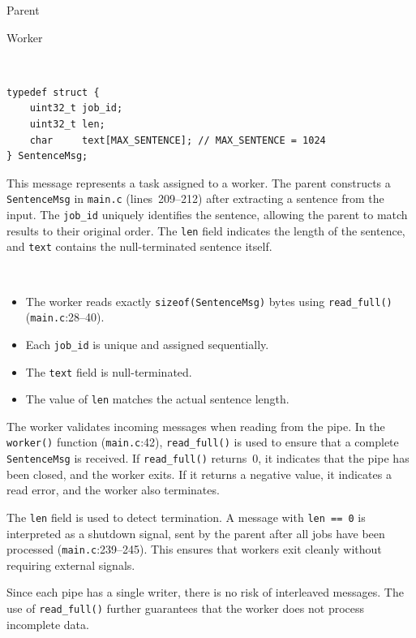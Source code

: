 \documentclass[12pt]{article}
\begin{document}
\begin{description}[style=nextline]
  \item[Sender] Parent
  \item[Receiver] Worker
  \item[Encoding]~

\begin{lstlisting}
typedef struct {
    uint32_t job_id;
    uint32_t len;
    char     text[MAX_SENTENCE]; // MAX_SENTENCE = 1024
} SentenceMsg;
\end{lstlisting}

  \item[Semantics]
    This message represents a task assigned to a worker. The parent
    constructs a \texttt{SentenceMsg} in \texttt{main.c} (lines~209--212)
    after extracting a sentence from the input. The \texttt{job\_id}
    uniquely identifies the sentence, allowing the parent to match results
    to their original order. The \texttt{len} field indicates the length of
    the sentence, and \texttt{text} contains the null-terminated sentence
    itself.

  \item[Invariants]~
    \begin{itemize}
      \item The worker reads exactly \texttt{sizeof(SentenceMsg)} bytes
            using \texttt{read\_full()} (\texttt{main.c}:28--40).
      \item Each \texttt{job\_id} is unique and assigned sequentially.
      \item The \texttt{text} field is null-terminated.
      \item The value of \texttt{len} matches the actual sentence length.
    \end{itemize}

  \item[Error handling]
    The worker validates incoming messages when reading from the pipe. In
    the \texttt{worker()} function (\texttt{main.c}:42), \texttt{read\_full()}
    is used to ensure that a complete \texttt{SentenceMsg} is received. If
    \texttt{read\_full()} returns~0, it indicates that the pipe has been
    closed, and the worker exits. If it returns a negative value, it
    indicates a read error, and the worker also terminates.

    The \texttt{len} field is used to detect termination. A message with
    \texttt{len == 0} is interpreted as a shutdown signal, sent by the
    parent after all jobs have been processed (\texttt{main.c}:239--245).
    This ensures that workers exit cleanly without requiring external
    signals.

    Since each pipe has a single writer, there is no risk of interleaved
    messages. The use of \texttt{read\_full()} further guarantees that the
    worker does not process incomplete data.
\end{description}
\end{document}
